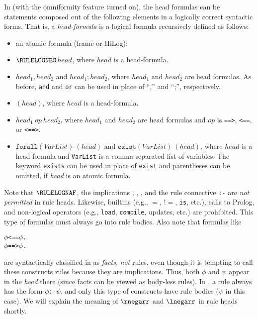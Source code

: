 In \FLSYSTEM (with the omniformity feature turned on), the head formulas can be statements composed out of the
following elements in a logically correct syntactic forms. That is, a
\emph{head-formula} is a logical formula recursively defined as follows:
\begin{itemize}
\item  an atomic formula (frame or HiLog);
\item  $\RULELOGNEG\,head$, where $head$ is a head-formula.
\item  $head_1,head_2$ and $head_1;head_2$, where $head_1$ and $head_2$ are
  head formulas. As before, \texttt{\bs{}and} and \texttt{\bs{}or} can be used in place
  of ``,'' and ``;'', respectively.
\item $(head)$, where $head$ is a head-formula.
\item  $head_1 ~op~ head_2$, where $head_1$ and $head_2$ are
  head formulas and $op$ is \texttt{==>}, \texttt{<==}, or \texttt{<==>}.
\item  $\texttt{forall}(VarList)\widehat{\ }(head)$ and $\texttt{exist}(VarList)\widehat{\ }(head)$, where
  $head$ is a head-formula and \texttt{VarList} is a comma-separated list of
  variables. The keyword \texttt{exists} can be used in place of
  \texttt{exist} and parentheses can be omitted, if \emph{head} is an
  atomic formula.   
\end{itemize}
Note that $\RULELOGNAF$, the implications \rnafarr, \lnafarr,
\rlnafarr, and the rule connective \texttt{:-}  are \emph{not permitted} in rule heads.
Likewise, builtins (e.g., $=$, $!=$, \texttt{\bs{}is}, etc.), calls to Prolog,
and non-logical
operators (e.g., \texttt{load}, \texttt{compile}, updates, etc.) are
prohibited. This type of formulas must always go into rule bodies.
Also note that formulas like
\begin{alltt}
   \ensuremath{\phi} <== \ensuremath{\phi}.
   \ensuremath{\phi} ==> \ensuremath{\phi}.
\end{alltt}
are syntactically classified in \ERGO as \emph{facts}, \emph{not} rules,  even
though it is
tempting to call these constructs rules because they are implications.
Thus, both $\phi$ and $\psi$ appear in the \emph{head} there (since facts
can be viewed as body-less rules). 
In \ERGO, a rule always has the form $\phi$\texttt{:-}$\psi$, and only this
type of constructs have rule bodies ($\psi$ in this case).
We will explain the meaning of $\rnegarr$ and $\lnegarr$ in rule heads
shortly.

